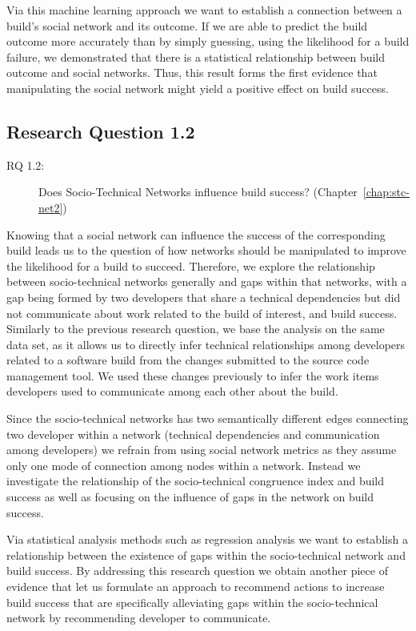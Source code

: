 Via this machine learning approach we want to establish a connection between a build's social network and its outcome. 
If we are able to predict the build outcome more accurately than by simply guessing, using the likelihood for a build failure, we demonstrated that there is a statistical relationship between build outcome and social networks.
Thus, this result forms the first evidence that manipulating the social network might yield a positive effect on build success.

\subsection{Research Question 1.2}
\begin{description}
  \item[RQ 1.2:] Does Socio-Technical Networks influence build success? (Chapter~\ref{chap:stc-net2})
\end{description}

Knowing that a social network can influence the success of the corresponding build leads us to the question of how networks should be manipulated to improve the likelihood for a build to succeed.
Therefore, we explore the relationship between socio-technical networks generally and gaps within that networks, with a gap being formed by two developers that share a technical dependencies but did not communicate about work related to the build of interest, and build success.
Similarly to the previous research question, we base the analysis on the same data set, as it allows us to directly infer technical relationships among developers related to a software build from the changes submitted to the source code management tool.
We used these changes previously to infer the work items developers used to communicate among each other about the build.

Since the socio-technical networks has two semantically different edges connecting two developer within a network (technical dependencies and communication among developers) we refrain from using social network metrics as they assume only one mode of connection among nodes within a network.
Instead we investigate the relationship of the socio-technical congruence index and build success as well as focusing on the influence of gaps in the network on build success.

Via statistical analysis methods such as regression analysis we want to establish a relationship between the existence of gaps within the socio-technical network and build success.
By addressing this research question we obtain another piece of evidence that let us formulate an approach to recommend actions to increase build success that are specifically alleviating gaps within the socio-technical network by recommending developer to communicate.

